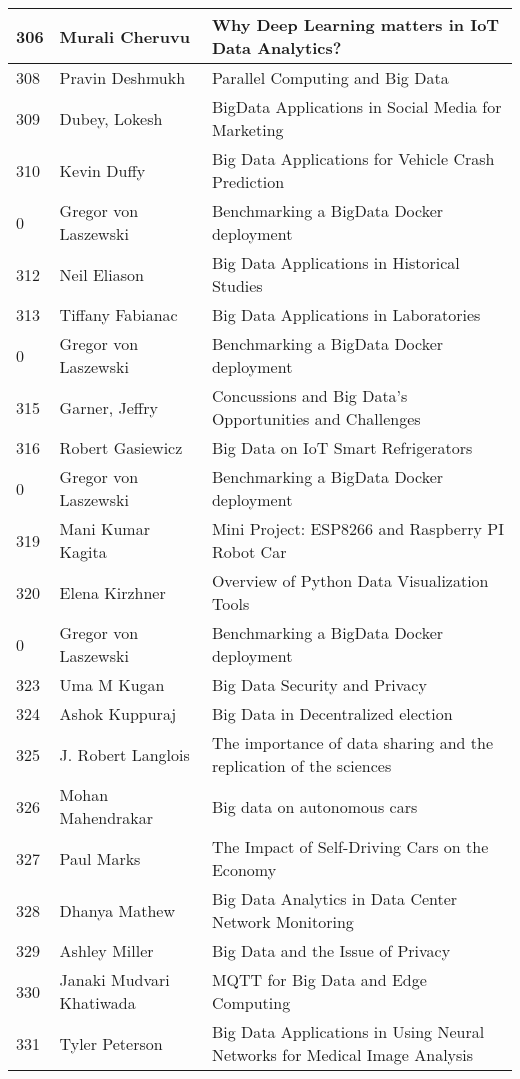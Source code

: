\documentclass[12pt]{book}
\begin{document}
\begin{footnotesize}
\begin{longtable}{|p{1cm}p{5cm}p{9cm}|}
306 & Murali Cheruvu & Why Deep Learning matters in IoT Data Analytics?  \\
\hline
308 & Pravin Deshmukh & Parallel Computing and Big Data  \\
\hline
309 & Dubey, Lokesh & BigData Applications in Social Media for Marketing  \\
\hline
310 & Kevin Duffy & Big Data Applications for Vehicle Crash Prediction  \\
\hline
0 & Gregor von Laszewski & Benchmarking a BigData Docker deployment  \\
\hline
312 & Neil Eliason & Big Data Applications in Historical Studies  \\
\hline
313 & Tiffany Fabianac & Big Data Applications in Laboratories  \\
\hline
0 & Gregor von Laszewski & Benchmarking a BigData Docker deployment  \\
\hline
315 & Garner, Jeffry & Concussions and Big Data's Opportunities and Challenges  \\
\hline
316 & Robert Gasiewicz & Big Data on IoT Smart Refrigerators  \\
\hline
0 & Gregor von Laszewski & Benchmarking a BigData Docker deployment  \\
\hline
319 & Mani Kumar Kagita & Mini Project: ESP8266 and Raspberry PI Robot Car  \\
\hline
320 & Elena Kirzhner & Overview of Python Data Visualization Tools  \\
\hline
0 & Gregor von Laszewski & Benchmarking a BigData Docker deployment  \\
\hline
323 & Uma M Kugan & Big Data Security and Privacy  \\
\hline
324 & Ashok Kuppuraj & Big Data in Decentralized election  \\
\hline
325 & J. Robert Langlois & The importance of data sharing and the replication of the sciences  \\
\hline
326 & Mohan Mahendrakar & Big data on autonomous cars  \\
\hline
327 & Paul Marks & The Impact of Self-Driving Cars on the Economy  \\
\hline
328 & Dhanya Mathew & Big Data Analytics in Data Center Network Monitoring  \\
\hline
329 & Ashley Miller & Big Data and the Issue of Privacy  \\
\hline
330 & Janaki Mudvari Khatiwada & MQTT for Big Data and Edge Computing  \\
\hline
331 & Tyler Peterson & Big Data Applications in Using Neural Networks for Medical Image Analysis

\end{longtable}
\end{footnotesize}
\end{document}
